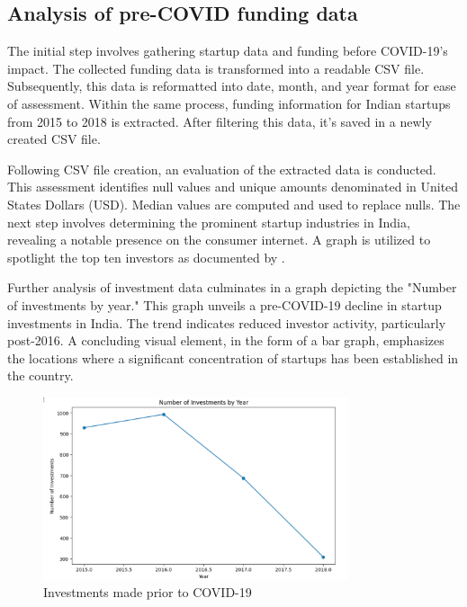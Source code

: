 \documentclass[12pt]{article}
\begin{document}
\subsection{Analysis of pre-COVID funding data}

The initial step involves gathering startup data and funding before COVID-19's impact. The collected funding data is transformed into a readable CSV file. Subsequently, this data is reformatted into date, month, and year format for ease of assessment. Within the same process, funding information for Indian startups from 2015 to 2018 is extracted. After filtering this data, it's saved in a newly created CSV file.

Following CSV file creation, an evaluation of the extracted data is conducted. This assessment identifies null values and unique amounts denominated in United States Dollars (USD). Median values are computed and used to replace nulls. The next step involves determining the prominent startup industries in India, revealing a notable presence on the consumer internet. A graph is utilized to spotlight the top ten investors as documented by \citep{dalal2019esg}.

Further analysis of investment data culminates in a graph depicting the "Number of investments by year." This graph unveils a pre-COVID-19 decline in startup investments in India. The trend indicates reduced investor activity, particularly post-2016. A concluding visual element, in the form of a bar graph, emphasizes the locations where a significant concentration of startups has been established in the country.

\begin{figure}[ht]
    \centering
    \includegraphics[width = 0.8\textwidth]{Figures/Pre_covid_Investments_Year.png}
    \caption{Investments made prior to COVID-19}
    \label{fig:Investments made prior to COVID-19}
\end{figure}
\end{document}
